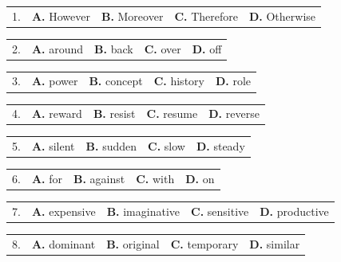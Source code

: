 \documentclass[UTF8,11pt]{ctexart}
\begin{document}
\noindent\begin{tabularx}{\linewidth}{@{}lXXXX@{}}1. & \textbf{A.} However & \textbf{B.} Moreover & \textbf{C.} Therefore & \textbf{D.} Otherwise\\\end{tabularx}\par

\noindent\begin{tabularx}{\linewidth}{@{}lXXXX@{}}2. & \textbf{A.} around & \textbf{B.} back & \textbf{C.} over & \textbf{D.} off\\\end{tabularx}\par

\noindent\begin{tabularx}{\linewidth}{@{}lXXXX@{}}3. & \textbf{A.} power & \textbf{B.} concept & \textbf{C.} history & \textbf{D.} role\\\end{tabularx}\par

\noindent\begin{tabularx}{\linewidth}{@{}lXXXX@{}}4. & \textbf{A.} reward & \textbf{B.} resist & \textbf{C.} resume & \textbf{D.} reverse\\\end{tabularx}\par

\noindent\begin{tabularx}{\linewidth}{@{}lXXXX@{}}5. & \textbf{A.} silent & \textbf{B.} sudden & \textbf{C.} slow & \textbf{D.} steady\\\end{tabularx}\par

\noindent\begin{tabularx}{\linewidth}{@{}lXXXX@{}}6. & \textbf{A.} for & \textbf{B.} against & \textbf{C.} with & \textbf{D.} on\\\end{tabularx}\par

\noindent\begin{tabularx}{\linewidth}{@{}lXXXX@{}}7. & \textbf{A.} expensive & \textbf{B.} imaginative & \textbf{C.} sensitive & \textbf{D.} productive\\\end{tabularx}\par

\noindent\begin{tabularx}{\linewidth}{@{}lXXXX@{}}8. & \textbf{A.} dominant & \textbf{B.} original & \textbf{C.} temporary & \textbf{D.} similar\\\end{tabularx}\par
\end{document}
